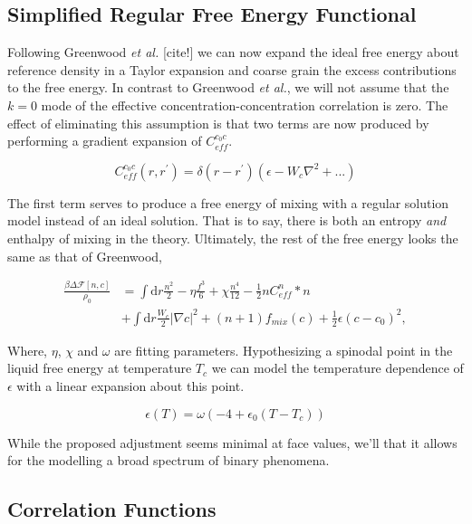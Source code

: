 \documentclass[showkeys, prb, reprint]{revtex4-1}
\newcommand{\F}{\mathcal{F}}
\renewcommand{\d}{\mathrm{d}}
\renewcommand{\l}{\left}
\renewcommand{\r}{\right}
\newcommand{\f}{\frac}
\begin{document}
\subsection{Simplified Regular Free Energy Functional}

Following Greenwood \textit{et al.} [cite!] we can now expand the ideal free energy about reference density in a Taylor expansion and coarse grain the excess contributions to the free energy. In contrast to Greenwood \textit{et al.}, we will not assume that the $k = 0$ mode of the effective concentration-concentration correlation is zero. The effect of eliminating this assumption is that two terms are now produced by performing a gradient expansion of $C^{c_0c}_{eff}$.

\begin{equation}
	C^{c_0 c}_{eff}(r, r^\prime) = \delta(r - r^\prime)\l(\epsilon  - W_c \nabla^2 + ... \r)
\end{equation}

The first term serves to produce a free energy of mixing with a regular solution model instead of an ideal solution. That is to say, there is both an entropy \textit{and} enthalpy of mixing in the theory. Ultimately, the rest of the free energy looks the same as that of Greenwood,

\begin{align}
	\f{\beta \Delta \F[n, c]}{\rho_0} &= \int \d r \f{n^2}{2} - \eta \f{f^3}{6} + \chi \f{n^4}{12} -\f{1}{2} n C^{n}_{eff} \ast n \\
	&+ \int \d r \f{W_c}{2} \l\vert\nabla c\r\vert^2 + (n + 1) f_{mix}(c) + \f{1}{2} \epsilon (c- c_0)^2, \nonumber
\end{align}

Where, $\eta$, $\chi$ and $\omega$ are fitting parameters. Hypothesizing a spinodal point in the liquid free energy at temperature $T_c$ we can model the temperature dependence of $\epsilon$ with a linear expansion about this point. 

\begin{equation}
	\epsilon(T) = \omega \l( -4 + \epsilon_0 \l(T - T_c\r)\r) 
\end{equation}

While the proposed adjustment seems minimal at face values, we'll that it allows for the modelling a broad spectrum of binary phenomena.

\subsection{Correlation Functions}
\end{document}
